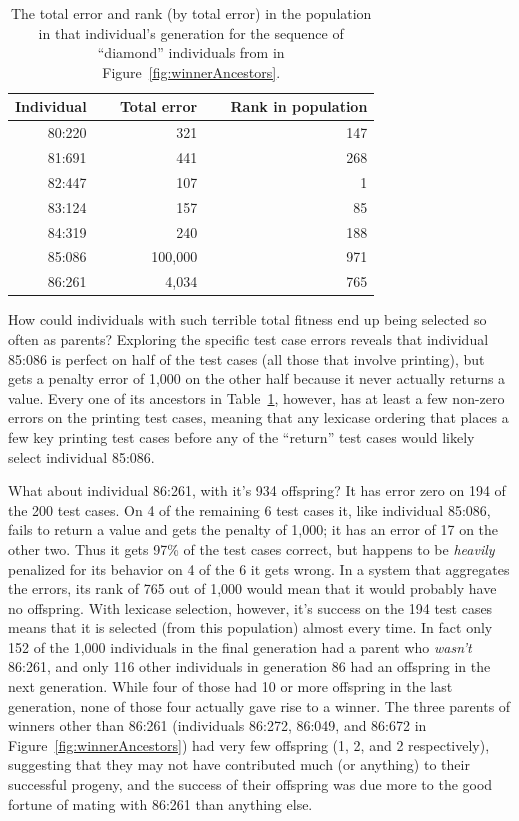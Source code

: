 \begin{table}[t]
	\caption{The total error and rank (by total error) in the population in that individual's generation
		for the sequence of ``diamond'' individuals from in Figure~\ref{fig:winnerAncestors}.}
	\label{table:winnerFitnesses}
	\begin{center}
	\begin{tabular}{rrr}
		Individual & $\quad$ Total error & $\quad$ Rank in population \\
		\hline\noalign{\smallskip}
		80:220 & 321 & 147 \\
		81:691 & 441 & 268 \\
		82:447 & 107 & 1 \\
		83:124 & 157 & 85 \\
		84:319 & 240 & 188 \\
		85:086 & 100,000 & 971 \\
		86:261 & 4,034 & 765
	\end{tabular}
	\end{center}
\end{table}

How could individuals with such terrible total fitness end up being selected so often as parents?
Exploring the specific test case errors reveals that individual 85:086 is perfect on half of the test
cases (all those that involve printing), but gets a penalty error of 1,000 on the other half
because it never actually returns a value. Every one of its ancestors in 
Table~\ref{table:winnerFitnesses}, however, has at least a few non-zero errors on the printing
test cases, meaning that any lexicase ordering that places a few key printing test cases before
any of the ``return'' test cases would likely select individual 85:086.

What about individual 86:261, with it's 934 offspring? It has error zero on 194 of the 200
test cases. On 4 of the remaining 6 test cases it,
like individual 85:086, fails to return a value and gets the penalty of 1,000; it has an error of 17 on
the other two. Thus it gets 97\% of the test cases correct, but happens to be \emph{heavily} penalized
for its behavior on 4 of the 6 it gets wrong. In a system that aggregates the errors, its rank of 765
out of 1,000 would mean that it would probably have no offspring. With lexicase selection, however,
it's success on the 194 test cases means that it is selected (from this population) almost every time.
In fact only 152 of the 1,000 individuals in the final generation had a parent who \emph{wasn't}
86:261, and only 116 other individuals in generation 86 had an offspring in the next generation. While
four of those had 10 or more offspring in the last generation, none of those four actually
gave rise to a winner. The three parents of winners other than 86:261 (individuals 86:272, 86:049, 
and 86:672 in Figure~\ref{fig:winnerAncestors}) had very few offspring (1, 2, and 2 respectively),
suggesting that they may not have contributed much (or anything) to their successful progeny, and 
the success of their offspring was due more to the good fortune of mating with 86:261 than anything else.

